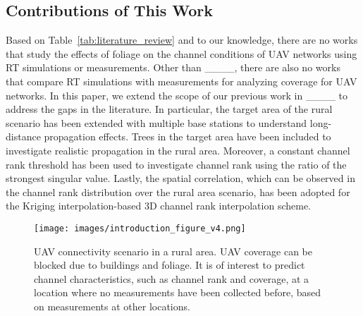 \subsection{Contributions of This Work}

 Based on Table~\ref{tab:literature_review} and to our knowledge, there are no works that study the effects of foliage on the channel conditions of UAV networks using RT simulations or measurements. Other than ____, there are also no works that compare RT simulations with measurements for analyzing coverage for UAV networks.  
In this paper, we extend the scope of our previous work in ____ to address the gaps in the literature. In particular, the target area of the rural scenario has been extended with multiple base stations to understand long-distance propagation effects. Trees in the target area have been included to investigate realistic propagation in the rural area. Moreover, a constant channel rank threshold has been used to investigate channel rank using the ratio of the strongest singular value. Lastly, the spatial correlation, which can be observed in the channel rank distribution over the rural area scenario, has been adopted for the Kriging interpolation-based 3D channel rank interpolation scheme.

     \begin{figure*}[t]
     \centering
     \texttt{[image: images/introduction\_figure\_v4.png]}
     \caption{UAV connectivity scenario in a rural area. UAV coverage can be blocked due to buildings and foliage. It is of interest to predict channel characteristics, such as channel rank and coverage, at a location where no measurements have been collected before, based on measurements at other locations.}     \label{fig:introduction_figure}
 \end{figure*}
